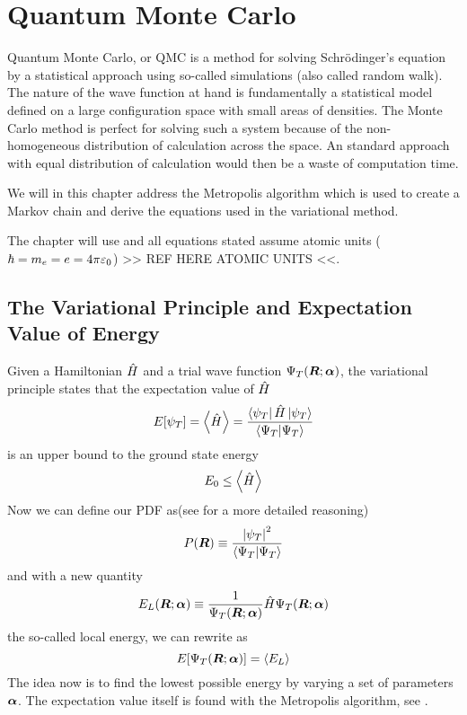 \section{Quantum Monte Carlo\label{sec:QMC}}
    Quantum Monte Carlo, or QMC is a method for solving Schrödinger's equation
    by a statistical approach using so-called  simulations
    (also called random walk). The nature of the wave function at hand is
    fundamentally a statistical model defined on a large configuration space
    with small areas of densities. The Monte Carlo method is perfect for
    solving such a system because of the non-homogeneous distribution of
    calculation across the space. An standard approach with equal distribution
    of calculation would then be a waste of computation time. 

    We will in this chapter address the Metropolis algorithm which is used to
    create a Markov chain and derive the equations used in the variational
    method.

    The chapter will use  \cite{GriffQuan} and all
    equations stated assume atomic units ($\hbar=m_e=e=4\pi\varepsilon_0$) >> REF
    HERE ATOMIC UNITS <<.

    \subsection{The Variational Principle and Expectation Value of Energy}
        Given a Hamiltonian $\hat{H}$ and a trial wave function ${\Psi}_T(\boldsymbol{{R}};\boldsymbol{{\alpha}})$, the
        variational principle \cite{GriffQuan, NeOr} states that the
        expectation value of $\hat{H}$
            \begin{equation}
                E[\psi_T] = \left< {\hat{H}} \right> =
                \frac{\bra{\psi_T}\hat{H}\ket{\psi_T}}{\bra{\Psi_T}\ket{\Psi_T}}
                \label{eq:ecpE}
            \end{equation}
        is an upper bound to the ground state energy
            \begin{equation}
                E_0 \leq \left< {\hat{H}} \right>
                \label{eq:ecpEBound}
            \end{equation}
        Now we can define our PDF as(see  for a more
        detailed reasoning)
            \begin{equation}
                P(\boldsymbol{{R}}) \equiv \frac{\abs{\psi_T}^2}{\bra{\Psi_T}\ket{\Psi_T}}
                \label{eq:PDFdef}
            \end{equation}
        and with a new quantity
            \begin{equation}
                E_L(\boldsymbol{{R}};\boldsymbol{{\alpha}}) \equiv \frac{1}{{\Psi}_T(\boldsymbol{{R}};\boldsymbol{{\alpha}})}\hat{H}{\Psi}_T(\boldsymbol{{R}};\boldsymbol{{\alpha}})
                \label{eq:ELdef}
            \end{equation}
        the so-called local energy, we can rewrite  as
            \begin{equation}
                E[{\Psi}_T(\boldsymbol{{R}};\boldsymbol{{\alpha}})] = \left< {E_L} \right>
            \end{equation}
        The idea now is to find the lowest possible energy by varying a set of
        parameters $\boldsymbol{{\alpha}}$. The expectation value itself is found with
        the Metropolis algorithm, see . \\

